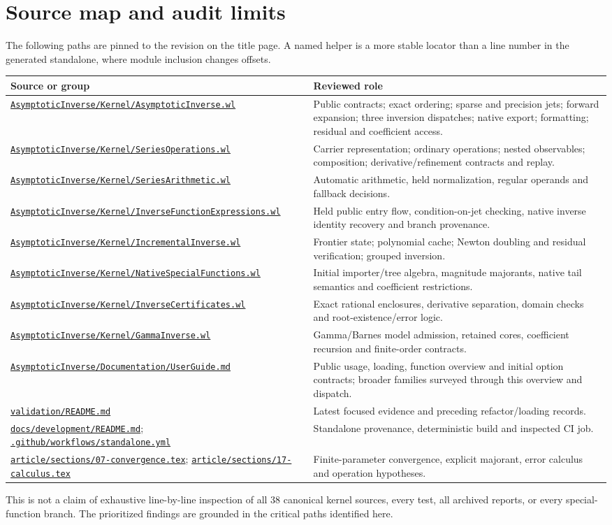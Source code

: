 \documentclass[11pt,a4paper]{article}
\newcommand{\repobase}{https://github.com/VladimirReshetnikov/Asymptotic/blob/07a9781212beb2eeb9ff16aa625b50ac27974078}
\newcommand{\rfile}[1]{\href{\repobase/#1}{\nolinkurl{#1}}}
\begin{document}
\section{Source map and audit limits}\label{app:sources}
The following paths are pinned to the revision on the title page. A named helper is a more stable locator than a line number in the generated standalone, where module inclusion changes offsets.
\begin{longtable}{@{}p{}p{}@{}}
\toprule
Source or group & Reviewed role\\\midrule\endhead
\rfile{AsymptoticInverse/Kernel/AsymptoticInverse.wl} & Public contracts; exact ordering; sparse and precision jets; forward expansion; three inversion dispatches; native export; formatting; residual and coefficient access.\\
\rfile{AsymptoticInverse/Kernel/SeriesOperations.wl} & Carrier representation; ordinary operations; nested observables; composition; derivative/refinement contracts and replay.\\
\rfile{AsymptoticInverse/Kernel/SeriesArithmetic.wl} & Automatic arithmetic, held normalization, regular operands and fallback decisions.\\
\rfile{AsymptoticInverse/Kernel/InverseFunctionExpressions.wl} & Held public entry flow, condition-on-jet checking, native inverse identity recovery and branch provenance.\\
\rfile{AsymptoticInverse/Kernel/IncrementalInverse.wl} & Frontier state; polynomial cache; Newton doubling and residual verification; grouped inversion.\\
\rfile{AsymptoticInverse/Kernel/NativeSpecialFunctions.wl} & Initial importer/tree algebra, magnitude majorants, native tail semantics and coefficient restrictions.\\
\rfile{AsymptoticInverse/Kernel/InverseCertificates.wl} & Exact rational enclosures, derivative separation, domain checks and root-existence/error logic.\\
\rfile{AsymptoticInverse/Kernel/GammaInverse.wl} & Gamma/Barnes model admission, retained cores, coefficient recursion and finite-order contracts.\\
\rfile{AsymptoticInverse/Documentation/UserGuide.md} & Public usage, loading, function overview and initial option contracts; broader families surveyed through this overview and dispatch.\\
\rfile{validation/README.md} & Latest focused evidence and preceding refactor/loading records.\\
\rfile{docs/development/README.md}; \rfile{.github/workflows/standalone.yml} & Standalone provenance, deterministic build and inspected CI job.\\
\rfile{article/sections/07-convergence.tex}; \rfile{article/sections/17-calculus.tex} & Finite-parameter convergence, explicit majorant, error calculus and operation hypotheses.\\
\bottomrule
\end{longtable}
This is not a claim of exhaustive line-by-line inspection of all 38 canonical kernel sources, every test, all archived reports, or every special-function branch. The prioritized findings are grounded in the critical paths identified here.
\end{document}
